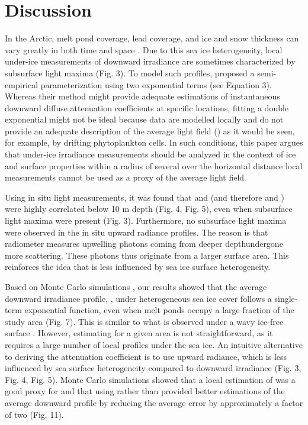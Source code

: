 \section{Discussion}

In the Arctic, melt pond coverage, lead coverage, and ice and snow thickness can vary greatly in both time and space \citep{Landy2014,Eicken2004}. Due to this sea ice heterogeneity, local under-ice measurements of downward irradiance are sometimes characterized by subsurface light maxima (Fig. 3). To model such profiles, \citet{Laney2017} proposed a semi-empirical parameterization using two exponential terms (see Equation 3). Whereas their method might provide adequate estimations of instantaneous downward diffuse attenuation coefficients at specific locations, fitting a double exponential might not be ideal because data are modelled locally and do not provide an adequate description of the average light field (\meanedz{}) as it would be seen, for example, by drifting phytoplankton cells. In such conditions, this paper argues that under-ice irradiance measurements should be analyzed in the context of ice and surface properties within a radius of several \DIFdelbegin {}\DIFdelend \DIFaddbegin {}\DIFaddend over the horizontal distance \DIFdelbegin {}\DIFdelend \DIFaddbegin {}\DIFaddend local measurements cannot be used as a proxy of the average light field.

Using in situ light measurements, it was found that \ed{} and \lu{} (and therefore \ked{} and \klu{}) were highly correlated below 10 m depth (Fig. 4, Fig. 5), even when subsurface light maxima were present (Fig. 3). Furthermore, no subsurface light maxima were observed in the in situ upward radiance profiles. The reason is that \DIFdelbegin {}\DIFdelend \DIFaddbegin {}\DIFaddend \lu{} radiometer measures upwelling photons coming from deeper depth\DIFdelbegin {}\DIFdelend \DIFaddbegin {}\DIFaddend undergone more scattering.  These photons thus originate from a larger surface area. This reinforces the idea that \lu{} is less influenced by sea ice surface heterogeneity. 

Based on Monte Carlo simulations \DIFaddbegin {}\DIFaddend , our results showed that the average downward irradiance profile, \meanedz{}, under heterogeneous sea ice cover follows a single-term exponential function, even when melt ponds occupy a large fraction of the study area (Fig. 7). This is similar to what is observed under a wavy ice-free surface \citep{Zaneveld2001}. However, estimating \meanedz{} for a given area is not straightforward, as it requires a large number of local \DIFaddbegin {}\DIFaddend profiles under the sea ice. An intuitive alternative to deriving the attenuation coefficient is to use upward radiance, which is less influenced by sea surface heterogeneity compared to downward irradiance (Fig. 3, Fig. 4, Fig. 5). Monte Carlo simulations showed that a local estimation of \klu{} was a good proxy for \meanked{} and that using \klu{} rather than \ked{} provided better estimations of the average downward profile by reducing the average error by approximately a factor of two (Fig. 11). 

